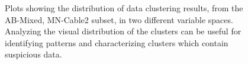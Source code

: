 \documentclass[final,authoryear,5p,times,twocolumn]{elsarticle}
\begin{document}
\begin{figure} [!ht]
    \begin{center}  
    \end{center}
\caption{Plots showing the distribution of data clustering results, from the AB-Mixed, MN-Cable2 subset, in two different variable spaces. Analyzing the visual distribution of the clusters can be useful for identifying patterns and characterizing clusters which contain suspicious data.}
\label{fig:AB_Mixed_MN_Cable2_ClusterComp}
\end{figure}
\end{document}
